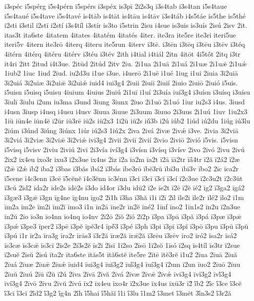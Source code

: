 {i3spéc
i5spérg
i5s4pérn
i5spérs
i3spéx
is3pī
2i2s3q
i3s4tab
i3s4tan
i5s4taue
i5s4taué
i5s4tave
i5s4tavé
is4tāb
is4tāt
is4tāu
is4tāv
i3s4táb
i4s5táe
is5the
is5thé
i2sti
i3stil
i2stī
i2stí
i3s4tíl
i3stír
is3to
i5strin
2isu
i4sue
is3uis
is3uís
2isú
2isv
2it.
itas3t
ita6ste
4itatem
4itates
4itatém
4itatés
4iter.
ite3ra
ite5re
ite3ri
iteri5ue
iteri5v
4itern
ite3rō
4iterq
4iteru
ite5run
4iterv
i3tē.
i3tēn
i3tēq
i3tēu
i3tēv
i3téq
4itérn
4itérq
4itéru
4itérv
i3téu
i3tév
2ith
i4tial
i4tiál
2itn
4itōt
4i5tṓt
2itq
i3tr
it4ri
2itt
2itud
i4t3ue.
2itūd
2itúd
2itv
2iu.
2i1ua
2i1uā
2i1uá
2i1uæ
2i1uǣ
2i1uǽ
1iub2
1iuc
1iud
2iud.
iu2d3u
i1ue
i3ue.
i4uerō
2i1uē
i1ué
1iug
i1ui
2iuia
3i2uiā
3i2uiá
3i2uiæ
3i2uiǣ
3i2uiǽ
iuid4
iui3g4
2iuii
2iuiī
2iuií
2iuio
2iuiō
2iuió
i5uis.
i5uisn
i5uisq
i5uisu
4iuium
4iuius
2iuiú
2i1uī
i1uí
2i3uía
iuí3g4
i3uísn
i3uísq
i3uísu
3iulī
3iulu
i2um
iu3ma
i3und
3iung
3iunx
2iuo
2i1uō
2i1uó
1iur
iu2s3
i4us.
3iusd
i4usn
3iusp
i4usq
i4usu
i4usv
3iuua
3iuue
2i3uum
3iuuo
2i3uus
2i1uú
1iuv
1iu2x3
1iū
iūn4e
iūn4ĕ
i2ūr
iū3rē
iū2s
iū2x3
1i2ŭ
iŭ2s
iŭ́3b
i2ú
iúb2
1iúd
iú2du
1iúg
iú3lu
2iúm
i3únd
3iúng
3iúnx
1iúr
iú2s3
1iú2x
2iva
2ivá
2ivæ
2ivǽ
i3ve.
2ivia
3i2viā
3i2viá
3i2viæ
3i2viǣ
3i2viǽ
ivi3g4
2ivii
2iviī
2ivií
2ivio
2iviō
2ivió
i5vis.
i5visn
i5visq
i5visv
2iviu
2iviú
2ivī
2i3vía
iví3g4
i3vísn
i3vísq
i3vísv
2ivo
2ivó
2ivu
2ivú
2ix2
ix4eu
ixo3r
ixu3
i2x3ue
ix4us
2iz
ī2a
īa2m
īa2t
ī2ā
īā2tr
īā́4tr
ī2ă
ī2á2
ī2æ
ī2ǣ
ī2ǽ
īb2
ība2
ī3bas
ī3băs
ībá2
ī3bás
ībe3rō
ībĕ3rŭ
ībī3u
ībī3v
ībo2
2īc
īca2r
ī5cene
ī4c3enn
ī3cē
ī5cĕnĕ
ī4c3ĕnn
īc3énn
ī3ci
ī3cī
ī3cĭ
ī3cí
ī2c3ue
ī2c3u2t
ī2c3ŭt
ī3cú
2īd2
īda2r
īde2s
īdē2s
ī3do
īd4or
ī3du
īdū2
ī2e
īe2t
ī2ē
ī2ĕ
īé2
īg2
ī3ga2
īgá2
ī3gæ3
ī3gǣ
ī3gn
īg4ne
īg4nu
īgo2
2ī1h
ī3ha
ī3hă
ī1i
ī2ī
2īl
īle2i
īle2r
īlé2
īlo2
ī1m
īm2a
īm2e
īm2i
īm2ĭ
īmo3
ī1n
īn2ā
īne2r
īn2ĕ
īné2
1īnf
īno2
1īn1s2
īn2u
ī2n3ue
īn2ŭ
2īo
īo3n
īo4nn
īo4nq
īo4nv
2ī2ō
2īŏ
2īó
2ī2p
ī3pa
ī3pā
ī3pă
ī3pá
ī3pæ
ī3pǣ
ī3pǽ
ī3pe3
īper2
ī3pē
ī3pĕ
īpĕ3r4
īpĕ́3
ī3pé
ī3ph
ī3pi
ī3pī
ī3pĭ
ī3pō
ī3pu
ī3pū
ī3pŭ
ī3pú
ī1r
īr2a
īra3g
īra2r
īrās3
ī3r2ă
īræ2ă
īrǣ2ă
ī3rēu
ī3rēv
īro2
īró2
īsa2r
īsá2
īs3cæ
īs3cǣ
īs3cī
2īs2e
2ī3s2ĕ
īs2i
2īsī
1ī2so
2īsō
1ī2sŏ
1īsó
ī2sq
īs4tíl
īs3tr
ī2sue
ī2suĕ
2īsŭ
2īsú
īta2r
īta6ste
ītăs5t
ītă6stĕ
īte5re
2ītē
ītĕ3rĕ
ī1u2
2īua
2īuā
2īuă
2īuá
2īuæ
2īuǣ
2īuǽ
īuid4
īui3g4
īuĭ3g2
īuĭ́3g4
īuí3g4
ī2um
ī2un
īuo2
2īuō
2īuu
2īuŭ
2īuú
2īū
ī2ŭ
ī2ú
2īva
2īvā
2īvă
2īvá
2īvæ
2īvǣ
2īvǽ
īvi3g4
īvĭ3g2
īvĭ́3g4
īví3g4
2īvō
2īvu
2īvŭ
2īvú
īx2
īx4eu
īxo4r
ī2x3ue
īx4us
īxū3r
ī2́
ī́b2
2ī́c
ī́3ce
ī́3cĕ
ī́3cī
ī́3cĭ
2ī́d2
ī́3g2
ī́g4n
2ī́h
ī́5hai
ī́5hăĭ
ī́1i
ī́3lu
ī́1m2
ī́3met
ī́3mĕt
3ī́n3s2
ī́3r2ă
}
